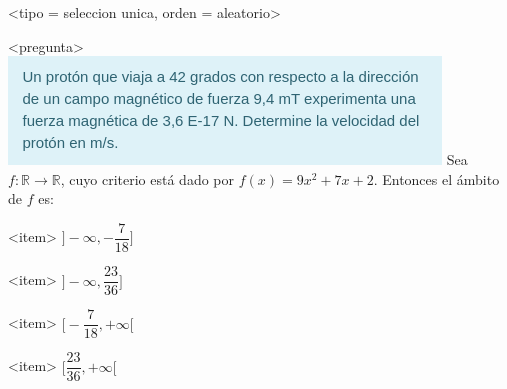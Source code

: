 <tipo = seleccion unica, orden = aleatorio>

<pregunta>
\includegraphics{preg1.png}
Sea $f:\mathbb R \to \mathbb R$, cuyo criterio est\'a dado por $f(x) = 9x^2 +7x +2$. Entonces el \'ambito de $f$ es:


<item>
$\bigg]{-}\infty, -\dfrac{7}{18}\bigg]$

<item>
$\bigg]{-}\infty, \dfrac{23}{36}\bigg]$

<item>
$\bigg[-\dfrac{7}{18}, +\infty\bigg[$

<item>
$\bigg[\dfrac{23}{36}, +\infty\bigg[$



